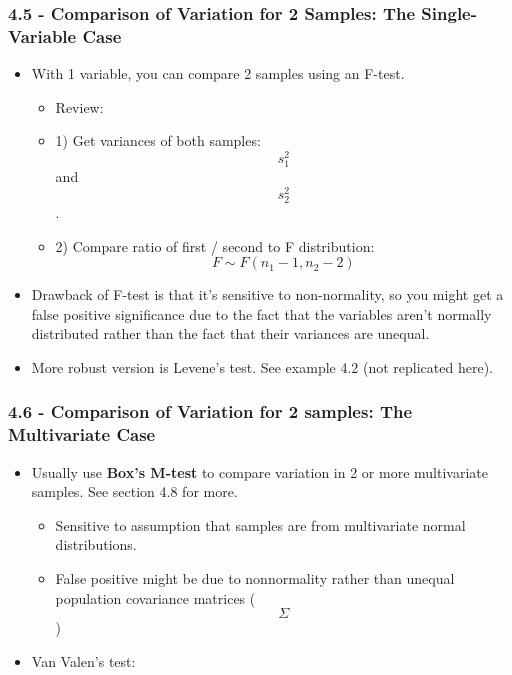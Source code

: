 \documentclass[]{article}
\providecommand{\tightlist}{%
  \setlength{\itemsep}{0pt}\setlength{\parskip}{0pt}}
\begin{document}
\hypertarget{comparison-of-variation-for-2-samples-the-single-variable-case}{%
\subsubsection{4.5 - Comparison of Variation for 2 Samples: The
Single-Variable
Case}\label{comparison-of-variation-for-2-samples-the-single-variable-case}}

\begin{itemize}
\tightlist
\item
  With 1 variable, you can compare 2 samples using an F-test.

  \begin{itemize}
  \tightlist
  \item
    Review:
  \item
    1) Get variances of both samples: \[s_1^2\] and \[s_2^2\].
  \item
    2) Compare ratio of first / second to F distribution:
    \[ F \sim F(n_1 - 1, n_2 - 2) \]
  \end{itemize}
\item
  Drawback of F-test is that it's sensitive to non-normality, so you
  might get a false positive significance due to the fact that the
  variables aren't normally distributed rather than the fact that their
  variances are unequal.
\item
  More robust version is Levene's test. See example 4.2 (not replicated
  here).
\end{itemize}

\hypertarget{comparison-of-variation-for-2-samples-the-multivariate-case}{%
\subsubsection{4.6 - Comparison of Variation for 2 samples: The
Multivariate
Case}\label{comparison-of-variation-for-2-samples-the-multivariate-case}}

\begin{itemize}
\tightlist
\item
  Usually use \textbf{Box's M-test} to compare variation in 2 or more
  multivariate samples. See section 4.8 for more.

  \begin{itemize}
  \tightlist
  \item
    Sensitive to assumption that samples are from multivariate normal
    distributions.
  \item
    False positive might be due to nonnormality rather than unequal
    population covariance matrices (\[\Sigma\])
  \end{itemize}
\item
  Van Valen's test:
\end{itemize}
\end{document}
